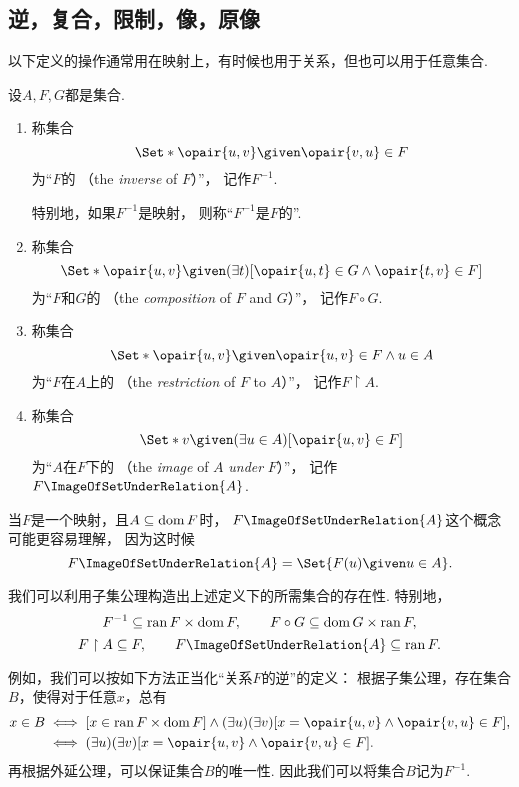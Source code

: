 \subsection{逆，复合，限制，像，原像}
以下定义的操作通常用在映射上，有时候也用于关系，但也可以用于任意集合.
\begin{definition}
设\(A,F,G\)都是集合.
\begin{enumerate}
	\item 称集合\[
		\Set*{ \opair{u,v} \given \opair{v,u} \in F }
	\]为“\(F\)的%
	（the \emph{inverse} of \(F\)）”，
	记作\(F^{-1}\).

	特别地，如果\(F^{-1}\)是映射，
	则称“\(F^{-1}\)是\(F\)的”.

	\item 称集合\[
		\Set*{ \opair{u,v} \given (\exists t)[\opair{u,t} \in G \land \opair{t,v} \in F] }
	\]为“\(F\)和\(G\)的%
	（the \emph{composition} of \(F\) and \(G\)）”，
	记作\(F \circ G\).

	\item 称集合\[
		\Set*{ \opair{u,v} \given \opair{u,v} \in F \land u \in A }
	\]为“\(F\)在\(A\)上的%
	（the \emph{restriction} of \(F\) to \(A\)）”，
	记作\(F \upharpoonright A\).

	\item 称集合\[
		\Set*{ v \given (\exists u \in A)[\opair{u,v} \in F] }
	\]为“\(A\)在\(F\)下的%
	（the \emph{image} of \(A\) \emph{under} \(F\)）”，
	记作\(F\ImageOfSetUnderRelation{A}\).
\end{enumerate}
\end{definition}

当\(F\)是一个映射，且\(A \subseteq \operatorname{dom} F\)时，
\(F\ImageOfSetUnderRelation{A}\)这个概念可能更容易理解，
因为这时候\[
	F\ImageOfSetUnderRelation{A}
	= \Set{ F(u) \given u \in A }.
\]

我们可以利用子集公理构造出上述定义下的所需集合的存在性.
特别地，\[
	F^{-1} \subseteq \operatorname{ran} F \times \operatorname{dom} F, \qquad
	F \circ G \subseteq \operatorname{dom} G \times \operatorname{ran} F,
\]\[
	F \upharpoonright A \subseteq F, \qquad
	F\ImageOfSetUnderRelation{A} \subseteq \ran F.
\]

例如，我们可以按如下方法正当化“关系\(F\)的逆”的定义：
根据子集公理，存在集合\(B\)，使得对于任意\(x\)，总有\begin{align*}
	x \in B
	&\iff
	[x \in \ran F \times \dom F]
	\land
	(\exists u)(\exists v)[x = \opair{u,v} \land \opair{v,u} \in F], \\
	&\iff
	(\exists u)(\exists v)[x = \opair{u,v} \land \opair{v,u} \in F].
\end{align*}
再根据外延公理，可以保证集合\(B\)的唯一性.
因此我们可以将集合\(B\)记为\(F^{-1}\).

